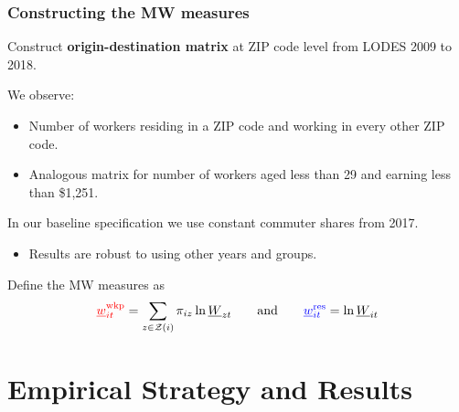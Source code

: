 \documentclass[aspectratio=169, t]{beamer}
\newcommand{\Z}{\mathcal{Z}}
\newcommand{\MW}{\underline{W}}
\newcommand{\mw}{\underline{w}}
\newcommand{\wkp}{\text{wkp}}
\newcommand{\res}{\text{res}}
\begin{document}
\begin{frame}
    \frametitle{Constructing the MW measures}
    
    \vspace{2mm}
    
    Construct \textbf{origin-destination matrix} at ZIP code level from LODES 2009 to 2018.
    
    \vspace{2mm}

    We observe:
    \begin{itemize} \small
        \item Number of workers residing in a ZIP code and working in every other ZIP code.
        \item Analogous matrix for number of workers aged less than 29 and earning less than 
        \$1,251.
    \end{itemize}
    
    \vspace{2mm}
    In our baseline specification we use constant commuter shares from 2017.
    \begin{itemize} \small
        \item Results are robust to using other years and groups.
    \end{itemize}

    \pause
    \vspace{5mm}
    Define the MW measures as
    $$
    {\color{red} \mw^{\wkp}_{it}} = \sum_{z \in \Z(i)} \pi_{i z} \ln \MW_{zt}
    \quad\quad\text{and}\quad\quad
    {\color{blue} \mw^{\res}_{it}} = \ln \MW_{it}
    $$
\end{frame}

\section{Empirical Strategy and Results}
\end{document}
